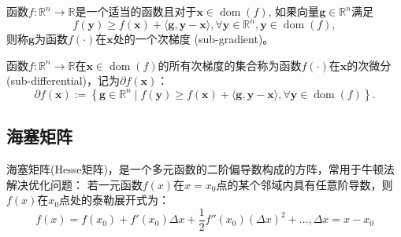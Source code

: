 \begin{definition}[次梯度]
    函数$f: \mathbb{R}^{n} \rightarrow \mathbb{R}$是一个适当的函数且对于$\bm{x} \in \operatorname{dom}(f)$, 如果向量$\bm{g} \in \mathbb{R}^{n}$满足
    \begin{equation}
        f(\bm{y}) \geq f(\bm{x})+\langle\bm{g}, \bm{y}-\bm{x}\rangle, \forall \bm{y} \in \mathbb{R}^{n}, \bm{y} \in \operatorname{dom}(f) ,
        \nonumber
    \end{equation}
    则称$\bm{g}$为函数$f(\cdot)$在$\bm{x}$处的一个次梯度 (sub-gradient)。
\end{definition}

\begin{definition}[次微分]
    函数$f: \mathbb{R}^{n} \rightarrow \mathbb{R}$在$\bm{x} \in \operatorname{dom}(f)$的所有次梯度的集合称为函数$f(\cdot)$在$\bm{x}$的次微分 (sub-differential)，记为$\partial f(\bm{x})$：
    \begin{equation}
        \partial f(\bm{x}):=\left\{\bm{g} \in \mathbb{R}^{n} \mid f(\bm{y}) \geq f(\bm{x})+\langle\bm{g}, \bm{y}-\bm{x}\rangle, \forall \bm{y} \in \operatorname{dom}(f)\right\} .
        \nonumber
    \end{equation}
\end{definition}



\subsection{海塞矩阵}
海塞矩阵(Hesse矩阵)，是一个多元函数的二阶偏导数构成的方阵，常用于牛顿法解决优化问题：
若一元函数$f(x)$在$x=x_0$点的某个邻域内具有任意阶导数，则$f(x)$在$x_0$点处的泰勒展开式为：
\begin{equation}
    f(x) = f(x_0) + f'(x_0)\Delta x + \frac{1}{2}f''(x_0)(\Delta x)^2 + ..., \Delta x = x - x_0
\end{equation}

